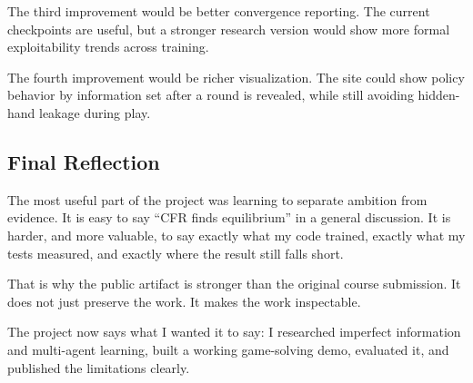 \documentclass[
]{article}
\begin{document}
The third improvement would be better convergence reporting. The current
checkpoints are useful, but a stronger research version would show more
formal exploitability trends across training.

The fourth improvement would be richer visualization. The site could
show policy behavior by information set after a round is revealed, while
still avoiding hidden-hand leakage during play.

\subsection{Final Reflection}\label{final-reflection}

The most useful part of the project was learning to separate ambition
from evidence. It is easy to say ``CFR finds equilibrium'' in a general
discussion. It is harder, and more valuable, to say exactly what my code
trained, exactly what my tests measured, and exactly where the result
still falls short.

That is why the public artifact is stronger than the original course
submission. It does not just preserve the work. It makes the work
inspectable.

The project now says what I wanted it to say: I researched imperfect
information and multi-agent learning, built a working game-solving demo,
evaluated it, and published the limitations clearly.
\end{document}
